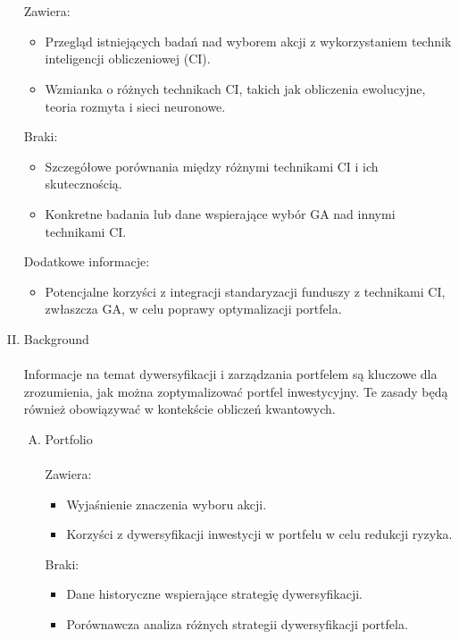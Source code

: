 \documentclass[polish,envcountsect,10pt]{article}
\begin{document}
\begin{enumerate}[I.]
    \\
    \\
    Zawiera:
        \begin{itemize}
          \item Przegląd istniejących badań nad wyborem akcji z wykorzystaniem technik inteligencji obliczeniowej (CI).
          \item Wzmianka o różnych technikach CI, takich jak obliczenia ewolucyjne, teoria rozmyta i sieci neuronowe.
        \end{itemize}
    Braki:
        \begin{itemize}
          \item Szczegółowe porównania między różnymi technikami CI i ich skutecznością.
          \item Konkretne badania lub dane wspierające wybór GA nad innymi technikami CI.
        \end{itemize}
    Dodatkowe informacje:
        \begin{itemize}
          \item Potencjalne korzyści z integracji standaryzacji funduszy z technikami CI, zwłaszcza GA, w celu poprawy optymalizacji portfela.
        \end{itemize}
    \item  Background
    \\
    \\
    Informacje na temat dywersyfikacji i zarządzania portfelem są kluczowe dla zrozumienia, jak można zoptymalizować portfel inwestycyjny. Te zasady będą również obowiązywać w kontekście obliczeń kwantowych.
        \begin{enumerate}[A.]
          \item Portfolio
            \\
            \\
            Zawiera:
                \begin{itemize}
                  \item Wyjaśnienie znaczenia wyboru akcji.
                  \item Korzyści z dywersyfikacji inwestycji w portfelu w celu redukcji ryzyka.
                \end{itemize}
            Braki:
                \begin{itemize}
                  \item Dane historyczne wspierające strategię dywersyfikacji.
                  \item Porównawcza analiza różnych strategii dywersyfikacji portfela.

\end{itemize}
\end{enumerate}
\end{enumerate}
\end{document}
